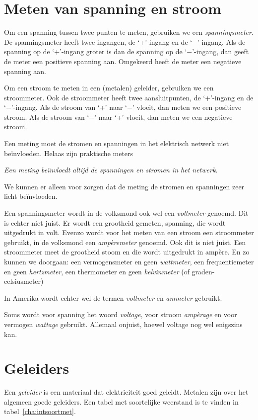 \section{Meten van spanning en stroom}
Om een spanning tussen twee punten te meten, gebruiken we een \textsl{spanningsmeter}. De spanningsmeter heeft twee ingangen, de `+'-ingang en de `$-$'-ingang. Als de spanning op de `+'-ingang groter is dan de spanning op de `$-$'-ingang, dan geeft de meter een positieve spanning aan. Omgekeerd heeft de meter een negatieve spanning aan.

Om een stroom te meten in een (metalen) geleider, gebruiken we een stroommeter. Ook de stroommeter heeft twee aansluitpunten, de `+'-ingang en de `$-$'-ingang. Als de stroom van `+' naar `$-$' vloeit, dan meten we een positieve stroom. Als de stroom van `$-$' naar `+' vloeit, dan meten we een negatieve stroom.

Een meting moet de stromen en spanningen in het elektrisch netwerk niet beïnvloeden. Helaas zijn praktische meters

\textsl{Een meting beïnvloedt altijd de spanningen en stromen in het netwerk.}

We kunnen er alleen voor zorgen dat de meting de stromen en spanningen zeer licht beïnvloeden.

\begin{infobox}
Een spanningsmeter wordt in de volksmond ook wel een \textsl{voltmeter} genoemd. Dit is echter niet juist. Er wordt een grootheid gemeten, spanning, die wordt uitgedrukt in volt. Evenzo wordt voor het meten van een stroom een stroommeter gebruikt, in de volksmond een \textsl{ampèremeter} genoemd. Ook dit is niet juist. Een stroommeter meet de grootheid stoom en die wordt uitgedrukt in ampère. En zo kunnen we doorgaan: een vermogensmeter en geen \textsl{wattmeter}, een frequentiemeter en geen \textsl{hertzmeter}, een thermometer en geen \textsl{kelvinmeter} (of graden-celsiusmeter)

In Amerika wordt echter wel de termen \textsl{voltmeter} en \textsl{ammeter} gebruikt.

Soms wordt voor spanning het woord \textsl{voltage}, voor stroom \textsl{ampèrage} en voor vermogen \textsl{wattage} gebruikt. Allemaal onjuist, hoewel voltage nog wel enigszins kan.
\end{infobox}

\section{Geleiders}
Een \textsl{geleider} is een materiaal dat elektriciteit goed geleidt. Metalen zijn over het algemeen goede geleiders. Een tabel met soortelijke weerstand is te vinden in tabel~\ref{cha:intsoortmet}.

